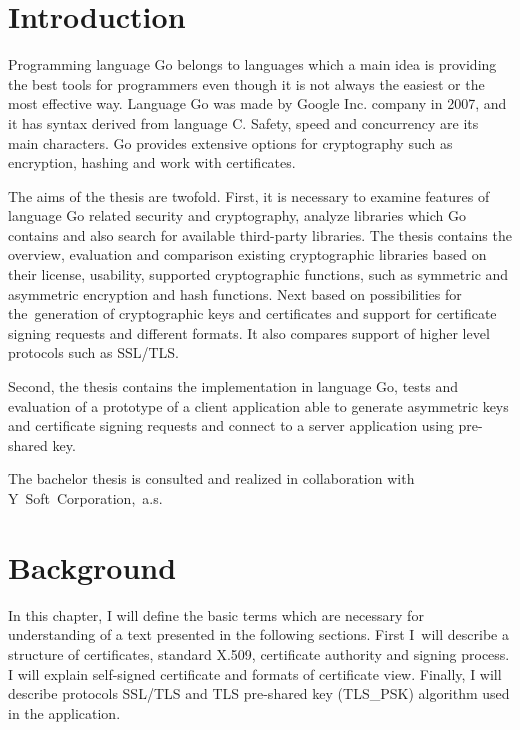 \documentclass[
  oneside, 12pt, 
  printed, %
  notable,   %
  nolof,     %
  nolot,     %
]{fithesis3}
\begin{document}
\chapter{Introduction}

Programming language Go belongs to languages which a main idea is providing the best tools for 
programmers even though it is not always the easiest or the most effective way. Language Go 
was made by Google Inc. company in 2007, and it has syntax derived from language C. Safety, speed 
and concurrency are its main characters. Go provides extensive options for cryptography such as 
encryption, hashing and work with certificates. 

The aims of the thesis are twofold. First, it is necessary to examine features of language Go 
related security and cryptography, analyze libraries which Go contains and also search for available 
third-party libraries. The thesis contains the overview, evaluation and comparison existing 
cryptographic libraries based on their license, usability, supported cryptographic functions, such 
as symmetric and asymmetric encryption and hash functions. Next based on possibilities for 
the~generation of cryptographic keys and certificates and support for certificate signing requests and different formats. It also compares support of higher level protocols such as SSL/TLS.    

Second, the thesis contains the implementation in language Go, tests and evaluation of a 
prototype of a client application able to generate asymmetric keys and certificate signing 
requests and connect to a server application using pre-shared key.

The bachelor thesis is consulted and realized in collaboration with Y~Soft~Corporation,~a.s.

\chapter{Background}
In this chapter, I will define the basic terms which are necessary for understanding of a 
text presented in the following sections. First I~will describe a structure of certificates, 
standard X.509, certificate authority and signing process. I will explain self-signed certificate 
and formats of certificate view. Finally, I will describe protocols SSL/TLS and TLS pre-shared key 
(TLS\_PSK) algorithm used in the application.
\end{document}
